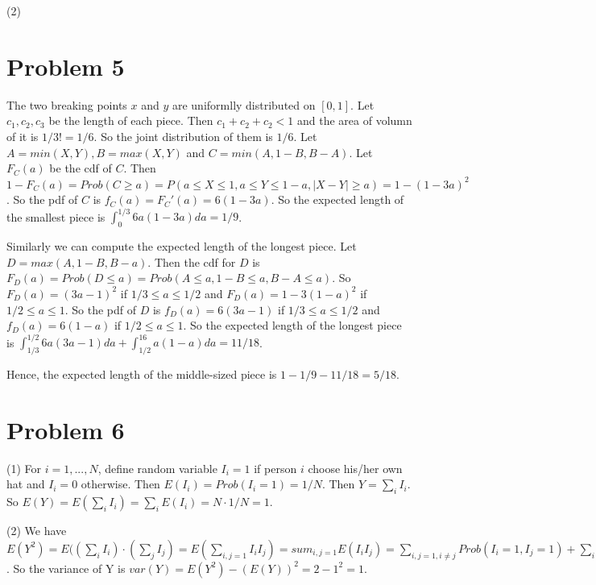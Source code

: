 \documentclass[12pt]{amsart}
\begin{document}
(2) 

\section{Problem 5}
The two breaking points $x$ and $y$ are uniformlly distributed on $[0,1]$. Let $c_1,c_2,c_3$ be the length of each piece. Then $c_1+c_2+c_2<1$ and the area of volumn of it is $1/3!=1/6$. So the joint distribution of them is $1/6$. Let $A=min(X,Y), B=max(X,Y)$ and $C=min(A,1-B,B-A)$. Let $F_C(a)$ be the cdf of $C$. Then $1-F_C(a)=Prob(C\geq a) = P(a\leq X\leq 1,a\leq Y\leq 1-a,|X-Y|\geq a)=1-(1-3a)^2$. So the pdf of $C$ is $f_C(a)=F_C'(a)=6(1-3a)$. So the expected length of the smallest piece is $\int_0^{1/3}6a(1-3a)da=1/9$.

Similarly we can compute the expected length of the longest piece. Let $D=max(A,1-B,B-a)$. Then the cdf for $D$ is $F_D(a)=Prob(D\leq a)=Prob(A\leq a,1-B\leq a,B-A\leq a)$. So $F_D(a)=(3a-1)^2$ if $1/3\leq a\leq 1/2$ and $F_D(a)=1-3(1-a)^2$ if $1/2\leq a\leq 1$. So the pdf of $D$ is $f_D(a)=6(3a-1)$ if $1/3\leq a\leq 1/2$ and $f_D(a)=6(1-a)$ if $1/2\leq a\leq 1$. So the expected length of the longest piece is 
$\int_{1/3}^{1/2}6a(3a-1)da + \int_{1/2}^16a(1-a)da = 11/18$. 

Hence, the expected length of the middle-sized piece is $1-1/9-11/18=5/18$.

\section{Problem 6}
(1) For $i=1,...,N$, define random variable $I_i=1$ if person $i$ choose his/her own hat and $I_i=0$ otherwise. Then $E(I_i)=Prob(I_i=1)=1/N$. Then $Y=\sum_iI_i$. So $E(Y)=E(\sum_iI_i)=\sum_i E(I_i)=N\cdot 1/N=1$.

(2) We have $E(Y^2)=E((\sum_iI_i)\cdot (\sum_jI_j) =E(\sum_{i,j=1}I_iI_j)=sum_{i,j=1}E(I_iI_j)=\sum_{i,j=1,i\neq j}Prob(I_i=1,I_j=1)+\sum_iProb(I_i=1)=\sum_{i,j=1,i\neq j}\frac{1}{N(N-1)}+\sum_iProb(I_i=1)\frac{1}{N}=1+1=2$. So the variance of Y is $var(Y)=E(Y^2)-(E(Y))^2=2-1^2=1$.
\end{document}
